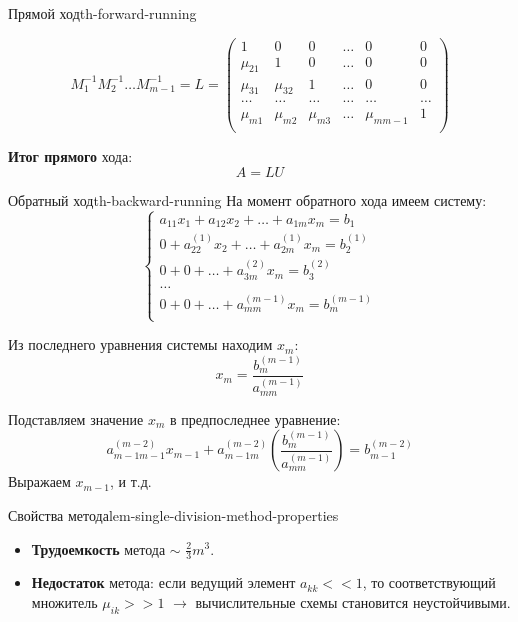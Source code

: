 \documentclass[14pt]{extarticle}
\begin{document}
\begin{theorem}{Прямой ход}{th-forward-running}
            \vspace{\baselineskip}

            $$
            M_{1}^{-1}M_{2}^{-1} \ldots M_{m - 1}^{-1} = L = \begin{pmatrix}
                1 & 0 & 0 & \ldots & 0 & 0\\
                \mu_{21} & 1 & 0 & \ldots & 0 & 0\\
                \mu_{31} & \mu_{32} & 1 & \ldots & 0 & 0\\
                \ldots & \ldots & \ldots & \ldots & \ldots & \ldots\\
                \mu_{m1} & \mu_{m2} & \mu_{m3} & \ldots & \mu_{mm-1} & 1\\
            \end{pmatrix}
            $$

            \vspace{\baselineskip}

            \textbf{Итог прямого} хода:
            $$A = LU$$

        \end{theorem}


        \begin{theorem}{Обратный ход}{th-backward-running}
            На момент обратного хода имеем систему:
            $$
            \begin{cases}
                a_{11}x_{1} + a_{12}x_{2} + \ldots + a_{1m}x_m = b_{1} \\
                0 + a_{22}^{(1)}x_{2} + \ldots + a_{2m}^{(1)}x_m = b_{2}^{(1)} \\
                0 + 0 + \ldots + a_{3m}^{(2)}x_m = b_{3}^{(2)} \\
                \ldots \\
                0 + 0 + \ldots + a_{mm}^{(m - 1)}x_m = b_{m}^{(m - 1)} \\
            \end{cases}
            $$

            Из последнего уравнения системы находим $x_{m}$:
            $$x_{m} = \frac{b_{m}^{(m - 1)}}{a_{mm}^{(m - 1)}}$$

            Подставляем значение $x_{m}$ в предпоследнее уравнение:
            $$a_{m-1m-1}^{(m - 2)}x_{m - 1} + a_{m-1m}^{(m - 2)}(\frac{b_{m}^{(m - 1)}}{a_{mm}^{(m - 1)}}) = b_{m-1}^{(m-2)}$$ 
            Выражаем $x_{m-1}$, и т.д.
        \end{theorem}

        \begin{lemma}{Свойства метода}{lem-single-division-method-properties}
            \begin{itemize}
                \item \textbf{Трудоемкость} метода $\sim$ $\frac{2}{3}m^{3}$.
                \item \textbf{Недостаток} метода: если ведущий элемент $a_{kk} << 1$, то соответствующий множитель $\mu_{ik} >> 1$ $\rightarrow$ вычислительные схемы становится неустойчивыми.
            \end{itemize}
        \end{lemma}
\end{document}

